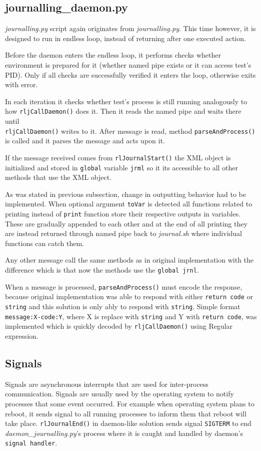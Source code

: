 \subsection{journalling\_daemon.py}
\textit{journalling.py} script again originates from \textit{journalling.py}. This time however, it is designed to run in endless loop, instead of returning after one executed action.

Before the daemon enters the endless loop, it performs checks whether environment is prepared for it (whether named pipe exists or it can access test's PID). Only if all checks are successfully verified it enters the loop, otherwise exits with error. 

In each iteration it checks whether test's  process is still running analogously to how \texttt{rljCallDaemon()} does it. Then it reads the named pipe and waits there until \\ \texttt{rljCallDaemon()} writes to it. After message is read, method \texttt{parseAndProcess()} is called and it parses the message and acts upon it. 

If the message received comes from \texttt{rlJournalStart()} the XML object is initialized and stored in \texttt{global} variable \texttt{jrml} so it its accessible to all other methods that use the XML object.

As was stated in previous subsection, change in outputting behavior had to be implemented. When optional argument \texttt{toVar} is detected all functions related to printing instead of \texttt{print} function store their respective outputs in variables. These are gradually appended to each other and at the end of all printing they are instead returned through named pipe back to \textit{journal.sh} where individual functions can catch them.

Any other message call the same methods as in original implementation with the difference which is that now the methods use the \texttt{global jrnl}.

When a message is processed, \texttt{parseAndProcess()} must encode the response, because original implementation was able to respond with either \texttt{return code} or \texttt{string} and this solution is only ably to respond with \texttt{string}. Simple format \texttt{message:X-code:Y}, where X is replace with \texttt{string} and Y with \texttt{return code}, was implemented which is quickly decoded by \texttt{rljCallDaemon()} using Regular expression\cite{regex}.

\subsection{Signals}
Signals are asynchronous interrupts that are used for inter-process communication. Signals are usually used by the operating system to notify processes that some event occurred\cite{signals}. For example when operating system plans to reboot, it sends signal to all running processes to inform them that reboot will take place. \texttt{rlJournalEnd()} in daemon-like solution sends signal \texttt{SIGTERM} to end \textit{daemon\_journalling.py}'s process where it is caught and handled by daemon's \texttt{signal handler}.


